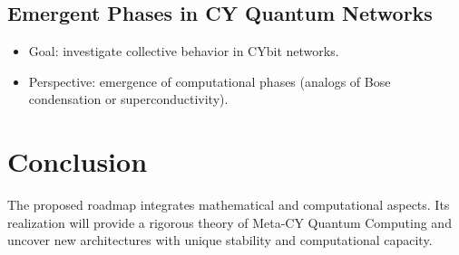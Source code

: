 \documentclass[12pt,a4paper]{article}
\begin{document}
\subsection{Emergent Phases in CY Quantum Networks}
\begin{itemize}
\item Goal: investigate collective behavior in CYbit networks.  
\item Perspective: emergence of computational phases (analogs of Bose condensation or superconductivity).  
\end{itemize}

\section{Conclusion}
The proposed roadmap integrates mathematical and computational aspects.
Its realization will provide a rigorous theory of Meta-CY Quantum Computing
and uncover new architectures with unique stability and computational capacity.  
\end{document}
